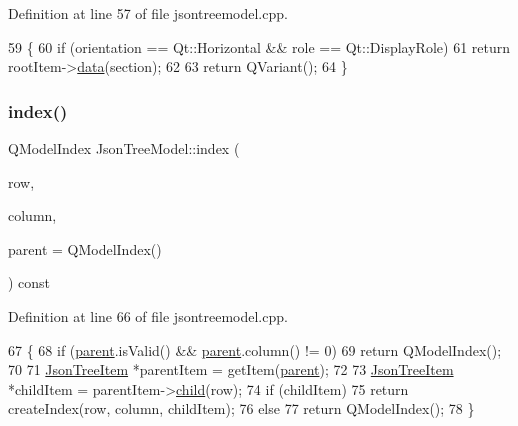 Definition at line 57 of file jsontreemodel.\+cpp.


\begin{DoxyCode}
59 \{
60     \textcolor{keywordflow}{if} (orientation == Qt::Horizontal && role == Qt::DisplayRole)
61         \textcolor{keywordflow}{return} rootItem->\hyperlink{class_json_tree_item_a3cd46e11efb01a8c7f59d6bf3c4582d4}{data}(section);
62 
63     \textcolor{keywordflow}{return} QVariant();
64 \}
\end{DoxyCode}
\mbox{\label{class_json_tree_model_ac8be89cc178ef5151479be23006d18e3}} 
\subsubsection{\texorpdfstring{index()}{index()}}
{\footnotesize\ttfamily Q\+Model\+Index Json\+Tree\+Model\+::index (\begin{DoxyParamCaption}\item[{int}]{row,  }\item[{int}]{column,  }\item[{const Q\+Model\+Index \&}]{parent = {\ttfamily QModelIndex()} }\end{DoxyParamCaption}) const}



Definition at line 66 of file jsontreemodel.\+cpp.


\begin{DoxyCode}
67 \{
68     \textcolor{keywordflow}{if} (\hyperlink{class_json_tree_model_aea54120cdf66d49e8f0ad176eed8fc99}{parent}.isValid() && \hyperlink{class_json_tree_model_aea54120cdf66d49e8f0ad176eed8fc99}{parent}.column() != 0)
69         \textcolor{keywordflow}{return} QModelIndex();
70 
71     \hyperlink{class_json_tree_item}{JsonTreeItem} *parentItem = getItem(\hyperlink{class_json_tree_model_aea54120cdf66d49e8f0ad176eed8fc99}{parent});
72 
73     \hyperlink{class_json_tree_item}{JsonTreeItem} *childItem = parentItem->\hyperlink{class_json_tree_item_a24864c7936a43d9059277a20497341b9}{child}(row);
74     \textcolor{keywordflow}{if} (childItem)
75         \textcolor{keywordflow}{return} createIndex(row, column, childItem);
76     \textcolor{keywordflow}{else}
77         \textcolor{keywordflow}{return} QModelIndex();
78 \}
\end{DoxyCode}
\mbox{\label{class_json_tree_model_aabc3f2fa08ef557663f8a4e49a214ef4}} 
